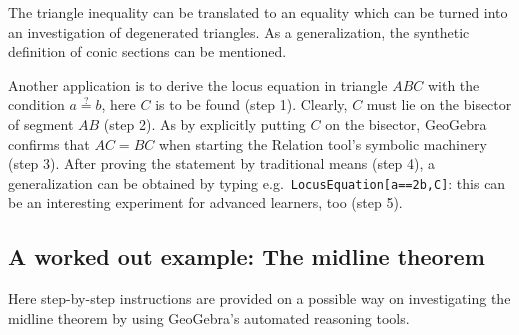 \documentclass{article}
\begin{document}
The triangle inequality can be translated to an equality which can be turned into an investigation of degenerated triangles. As a generalization, the synthetic definition of conic sections can be mentioned.

Another application is to derive the locus equation in triangle $ABC$ with the condition $a\stackrel{?}{=}b$, here $C$ is to be found (step 1). Clearly, $C$ must lie on the bisector of segment $AB$ (step 2). As  by explicitly putting $C$ on the bisector, GeoGebra confirms that $AC=BC$ when starting the Relation tool's symbolic machinery (step 3). After proving the statement by traditional means (step 4), a generalization can be obtained by typing e.g.~\texttt{LocusEquation[a==2b,C]}: this can be an interesting experiment for advanced learners, too (step 5).

\subsection{A worked out example: The midline theorem}

Here step-by-step instructions are provided on a possible way on investigating the midline theorem by using GeoGebra's automated reasoning tools.
\end{document}
